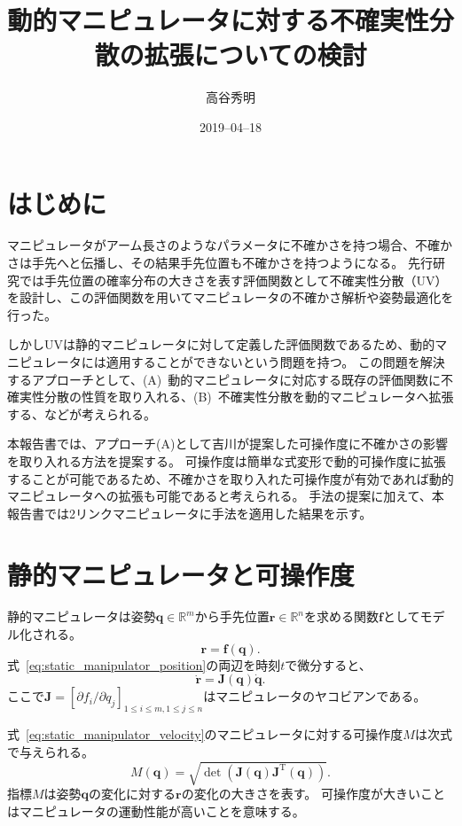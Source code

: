 \documentclass[10pt,a4j,twocolumn]{ltjsarticle}
\title{動的マニピュレータに対する不確実性分散の拡張についての検討} %
\author{高谷秀明}                              %
\date{2019--04--18}                              %
\begin{document}
\maketitle

\section{はじめに}

マニピュレータがアーム長さのようなパラメータに不確かさを持つ場合、不確かさは手先へと伝播し、その結果手先位置も不確かさを持つようになる。
先行研究では手先位置の確率分布の大きさを表す評価関数として不確実性分散（UV）を設計し、この評価関数を用いてマニピュレータの不確かさ解析や姿勢最適化を行った。

しかしUVは静的マニピュレータに対して定義した評価関数であるため、動的マニピュレータには適用することができないという問題を持つ。
この問題を解決するアプローチとして、(A)~動的マニピュレータに対応する既存の評価関数に不確実性分散の性質を取り入れる、(B)~不確実性分散を動的マニピュレータへ拡張する、などが考えられる。

本報告書では、アプローチ(A)として吉川が提案した可操作度に不確かさの影響を取り入れる方法を提案する。
可操作度は簡単な式変形で動的可操作度に拡張することが可能であるため、不確かさを取り入れた可操作度が有効であれば動的マニピュレータへの拡張も可能であると考えられる。
手法の提案に加えて、本報告書では2リンクマニピュレータに手法を適用した結果を示す。

\section{静的マニピュレータと可操作度}

静的マニピュレータは姿勢$\bm{q} \in \mathbb{R}^{m}$から手先位置$\bm{r} \in \mathbb{R}^{n}$を求める関数$\bm{f}$としてモデル化される。
\begin{equation}
  \bm{r} = \bm{f}(\bm{q}). \label{eq:static_manipulator_position}
\end{equation}
式~\eqref{eq:static_manipulator_position}の両辺を時刻$t$で微分すると、
\begin{equation}
  \dot{\bm{r}} = \bm{J}(\bm{q}) \dot{\bm{q}}. \label{eq:static_manipulator_velocity}
\end{equation}
ここで$\bm{J} = [\partial f_{i} / \partial q_{j}]_{1 \leq i \leq m, 1 \leq j \leq n}$はマニピュレータのヤコビアンである。

式~\eqref{eq:static_manipulator_velocity}のマニピュレータに対する可操作度$M$は次式で与えられる。
\begin{equation}
  M(\bm{q}) = \sqrt{\det \left( \bm{J}(\bm{q}) \bm{J}^{\mathrm{T}}(\bm{q}) \right)}.
\end{equation}
指標$M$は姿勢$\bm{q}$の変化に対する$\bm{r}$の変化の大きさを表す。
可操作度が大きいことはマニピュレータの運動性能が高いことを意味する。
\end{document}
